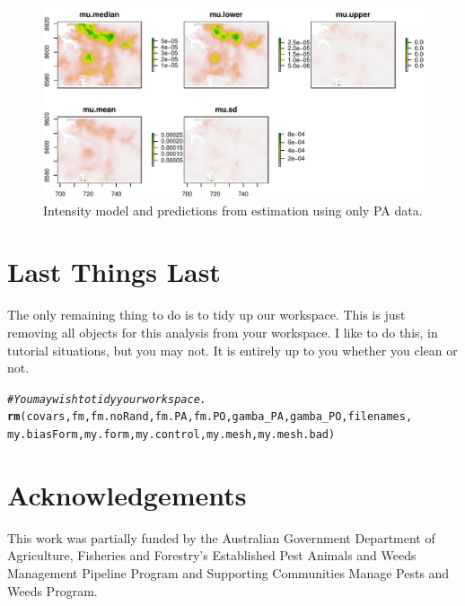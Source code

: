 \documentclass[article,shortnames,nojss]{jss}\usepackage[]{graphicx}\usepackage[]{xcolor}
\makeatletter
\def\maxwidth{ %
  \ifdim\Gin@nat@width>\linewidth
    \linewidth
  \else
    \Gin@nat@width
  \fi
}
\newcommand{\hlcom}[1]{\textcolor[rgb]{0.678,0.584,0.686}{\textit{#1}}}%
\newcommand{\hlstd}[1]{\textcolor[rgb]{0.345,0.345,0.345}{#1}}%
\newcommand{\hlkwd}[1]{\textcolor[rgb]{0.737,0.353,0.396}{\textbf{#1}}}%
\newenvironment{kframe}{%
 \def\at@end@of@kframe{}%
 \ifinner\ifhmode%
  \def\at@end@of@kframe{\end{minipage}}%
  \begin{minipage}{\columnwidth}%
 \fi\fi%
 \def\FrameCommand##1{\hskip\@totalleftmargin \hskip-\fboxsep
 \colorbox{shadecolor}{##1}\hskip-\fboxsep
     \hskip-\linewidth \hskip-\@totalleftmargin \hskip\columnwidth}%
 \MakeFramed {\advance\hsize-\width
   \@totalleftmargin\z@ \linewidth\hsize
   \@setminipage}}%
 {\par\unskip\endMakeFramed%
 \at@end@of@kframe}
\newenvironment{knitrout}{}{} %
\makeatother
\begin{document}
\begin{knitrout}
\begin{figure}
{\centering \includegraphics[width=\maxwidth]{figure/singleDataPA-1} 

}

\caption[Intensity model and predictions from estimation using only PA data]{Intensity model and predictions from estimation using only PA data.}\label{fig:singleDataPA}
\end{figure}

\end{knitrout}
  
\section*{Last Things Last}
  
The only remaining thing to do is to tidy up our workspace. This is just removing all objects for this analysis from your workspace. I like to do this, in tutorial situations, but you may not. It is entirely up to you whether you clean or not.
\begin{knitrout}
\color{fgcolor}\begin{kframe}
\begin{alltt}
\hlcom{#You may wish to tidy your workspace.}
\hlkwd{rm}\hlstd{( covars, fm, fm.noRand, fm.PA, fm.PO, gamba_PA, gamba_PO, filenames,}
             \hlstd{my.biasForm, my.form, my.control, my.mesh, my.mesh.bad)}
\end{alltt}
\end{kframe}
\end{knitrout}

\section*{Acknowledgements}

This work was partially funded by the Australian Government Department of Agriculture, Fisheries and Forestry’s Established Pest Animals and Weeds Management Pipeline Program and Supporting Communities Manage Pests and Weeds Program.
    
\end{document}
